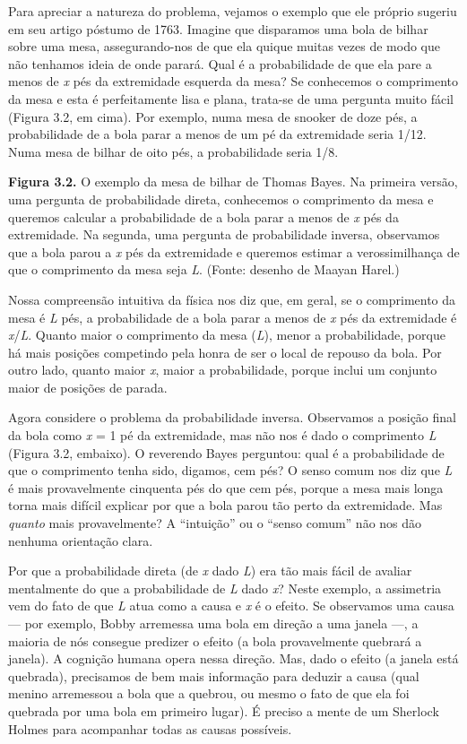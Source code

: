 \documentclass[11pt,a5paper,twoside]{book}
\begin{document}
Para apreciar a natureza do problema, vejamos o exemplo que ele próprio sugeriu em seu artigo póstumo de 1763. Imagine que disparamos uma bola de bilhar sobre uma mesa, assegurando-nos de que ela quique muitas vezes de modo que não tenhamos ideia de onde parará. Qual é a probabilidade de que ela pare a menos de \textit{x} pés da extremidade esquerda da mesa? Se conhecemos o comprimento da mesa e esta é perfeitamente lisa e plana, trata-se de uma pergunta muito fácil (Figura 3.2, em cima). Por exemplo, numa mesa de snooker de doze pés, a probabilidade de a bola parar a menos de um pé da extremidade seria 1/12. Numa mesa de bilhar de oito pés, a probabilidade seria 1/8.

\textbf{Figura 3.2.} O exemplo da mesa de bilhar de Thomas Bayes. Na primeira versão, uma pergunta de probabilidade direta, conhecemos o comprimento da mesa e queremos calcular a probabilidade de a bola parar a menos de \textit{x} pés da extremidade. Na segunda, uma pergunta de probabilidade inversa, observamos que a bola parou a \textit{x} pés da extremidade e queremos estimar a verossimilhança de que o comprimento da mesa seja \textit{L}. (Fonte: desenho de Maayan Harel.)

Nossa compreensão intuitiva da física nos diz que, em geral, se o comprimento da mesa é \textit{L} pés, a probabilidade de a bola parar a menos de \textit{x} pés da extremidade é \textit{x}/\textit{L}. Quanto maior o comprimento da mesa (\textit{L}), menor a probabilidade, porque há mais posições competindo pela honra de ser o local de repouso da bola. Por outro lado, quanto maior \textit{x}, maior a probabilidade, porque inclui um conjunto maior de posições de parada.

Agora considere o problema da probabilidade inversa. Observamos a posição final da bola como \textit{x} = 1 pé da extremidade, mas não nos é dado o comprimento \textit{L} (Figura 3.2, embaixo). O reverendo Bayes perguntou: qual é a probabilidade de que o comprimento tenha sido, digamos, cem pés? O senso comum nos diz que \textit{L} é mais provavelmente cinquenta pés do que cem pés, porque a mesa mais longa torna mais difícil explicar por que a bola parou tão perto da extremidade. Mas \textit{quanto} mais provavelmente? A “intuição” ou o “senso comum” não nos dão nenhuma orientação clara.

Por que a probabilidade direta (de \textit{x} dado \textit{L}) era tão mais fácil de avaliar mentalmente do que a probabilidade de \textit{L} dado \textit{x}? Neste exemplo, a assimetria vem do fato de que \textit{L} atua como a causa e \textit{x} é o efeito. Se observamos uma causa — por exemplo, Bobby arremessa uma bola em direção a uma janela —, a maioria de nós consegue predizer o efeito (a bola provavelmente quebrará a janela). A cognição humana opera nessa direção. Mas, dado o efeito (a janela está quebrada), precisamos de bem mais informação para deduzir a causa (qual menino arremessou a bola que a quebrou, ou mesmo o fato de que ela foi quebrada por uma bola em primeiro lugar). É preciso a mente de um Sherlock Holmes para acompanhar todas as causas possíveis.
\end{document}
